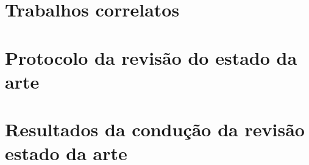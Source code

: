 \documentclass[
	12pt,				%
	oneside,			%
	a4paper,			%
	english,			%
	brazil				%
	]{abntex2ppgsi}
\begin{document}
\chapter{Trabalhos correlatos}\label{chapter:trabalhos-correlatos}

\postextual



%
%


\begin{apendicesenv}


%
%
%
\chapter{Protocolo da revisão do estado da arte}

\chapter{Resultados da condução da revisão estado da arte}

\end{apendicesenv}
\end{document}
